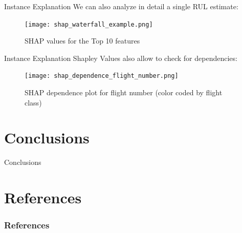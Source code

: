 \documentclass{beamer}
\begin{document}
        \begin{frame}{Instance Explanation}
            We can also analyze in detail a single RUL estimate:
            \begin{figure}
                \centering
                \texttt{[image: shap\_waterfall\_example.png]}
                \caption{SHAP values for the Top 10 features}
            \end{figure}
        \end{frame}

        \begin{frame}{Instance Explanation}
            Shapley Values also allow to check for dependencies:
            \begin{figure}
                \centering
                \texttt{[image: shap\_dependence\_flight\_number.png]}
                \caption{SHAP dependence plot for flight number (color coded by flight class)}
            \end{figure}
        \end{frame}

    \section{Conclusions}

        \begin{frame}{Conclusions}
            
        \end{frame}

    \section*{References}
        \begin{frame}[allowframebreaks]
            \frametitle{References}
            \printbibliography
        \end{frame}
\end{document}
